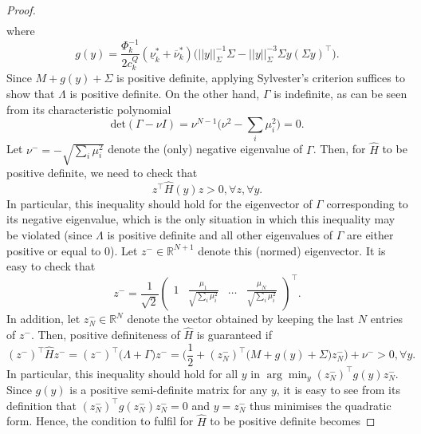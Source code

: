 \documentclass{article}
\begin{document}
\begin{proof}
\begin{align*}
\end{align*} 
where
\begin{equation*}
g(y) = \frac{\Phi_k^{-1}}{2 c_k^Q}(\underline{\nu}_k^* + \overline{\nu}_k^*)\Big(||y||_\Sigma^{-1} \Sigma - ||y||_\Sigma^{-3} \Sigma y(\Sigma y)^\top\Big).
\end{equation*}
Since $M + g(y) + \Sigma$ is positive definite, applying Sylvester's criterion suffices to show that $\Lambda$ is positive definite. On the other hand, $\Gamma$ is indefinite, as can be seen from its characteristic polynomial
\begin{equation*}
\mbox{det}(\Gamma - \nu I) = \nu^{N-1}\Big(\nu^2 - \sum_{i} \mu_i^2 \Big) = 0.
\end{equation*}
Let $\nu^- = -\sqrt{\sum_{i} \mu_i^2}$ denote the (only) negative eigenvalue of $\Gamma$. Then, for $\hat{H}$ to be positive definite, we need to check that
\begin{equation*}
z^\top \hat{H}(y) z > 0, \forall z, \forall y.
\end{equation*}
In particular, this inequality should hold for the eigenvector of $\Gamma$ corresponding to its negative eigenvalue, which is the only situation in which this inequality may be violated (since $\Lambda$ is positive definite and all other eigenvalues of $\Gamma$ are either positive or equal to $0$). Let $z^- \in \mathbb{R}^{N+1}$ denote this (normed) eigenvector. It is easy to check that
\begin{equation*}
z^- = \frac{1}{\sqrt{2}}\begin{pmatrix} 1 & \frac{\mu_1}{\sqrt{\sum_i \mu_i^2}} & \ldots & \frac{\mu_N}{\sqrt{\sum_i \mu_i^2}}\end{pmatrix}^\top.
\end{equation*}
In addition, let $z_N^- \in \mathbb{R}^N$ denote the vector obtained by keeping the last $N$ entries of $z^-$. Then, positive definiteness of $\hat{H}$ is guaranteed if
\begin{equation*}
(z^-)^\top \hat{H} z^- = (z^-)^\top\big(\Lambda + \Gamma\big) z^- = \Big(\frac{1}{2} + (z_N^-)^\top\big(M + g(y) + \Sigma\big)z_N^-\Big) + \nu^- > 0, \forall y.
\end{equation*}
In particular, this inequality should hold for all $y$ in $\arg \min_y (z_N^-)^\top g(y) z_N^-$. Since $g(y)$ is a positive semi-definite matrix for any $y$, it is easy to see from its definition that $(z_N^-)^\top g(z_N^-) z_N^- = 0$ and $y = z_N^-$ thus minimises the quadratic form. Hence, the condition to fulfil for $\hat{H}$ to be positive definite becomes

\end{proof}
\end{document}
